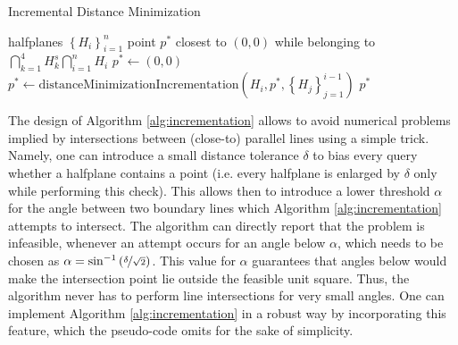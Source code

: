 \documentclass{article}
\begin{document}
\begin{algorithm}[h!]
	\caption{Incremental Distance Minimization}
	\label{alg:incrementalMin}
	\begin{algorithmic}
		\REQUIRE 	halfplanes $ \left\{ H_i\right\}_{i=1}^{n}$
		\ENSURE 	point $ p^* $ closest to $ (0,0) $ while belonging to $ \bigcap\limits_{k=1}^{4} H_k^s \bigcap\limits_{i=1}^{n} H_i$
		\STATE $ p^* \leftarrow (0,0) $
		\STATE $ p^* \leftarrow \text{distanceMinimizationIncrementation}\left(H_i, p^*, \left\{ H_j\right\}_{j=1}^{i-1}\right) $
		\ENDFOR
		\RETURN $ p^* $
	\end{algorithmic}
\end{algorithm}

The design of Algorithm \ref{alg:incrementation} allows to avoid numerical problems implied by intersections between (close-to) parallel lines using a simple trick. Namely, one can introduce a small distance tolerance $ \delta $ to bias every query whether a halfplane contains a point (i.e. every halfplane is enlarged by $\delta$ only while performing this check). This allows then to introduce a lower threshold $ \alpha $ for the angle between two boundary lines which Algorithm \ref{alg:incrementation} attempts to intersect. The algorithm can directly report that the problem is infeasible, whenever an attempt occurs for an angle below $ \alpha $, which needs to be chosen as $ \alpha = \sin^{-1}\left( \nicefrac{\delta}{\sqrt{2}} \right) $. This value for $ \alpha $ guarantees that angles below would make the intersection point lie outside the feasible unit square. Thus, the algorithm never has to perform line intersections for very small angles. One can implement Algorithm \ref{alg:incrementation} in a robust way by incorporating this feature, which the pseudo-code omits for the sake of simplicity.
\end{document}
